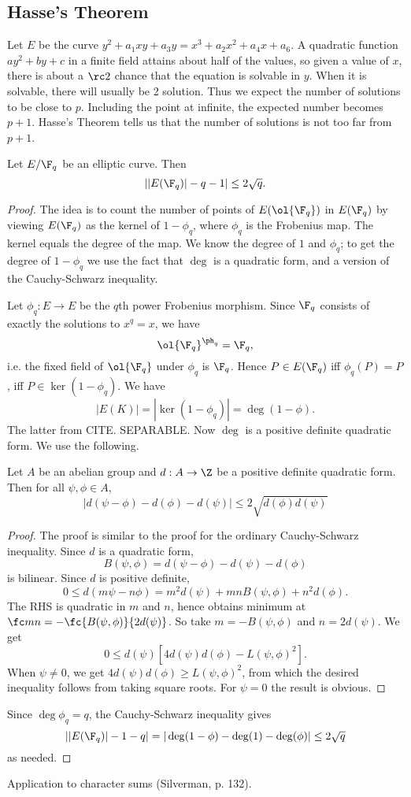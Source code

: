 \subsection{Hasse's Theorem}
Let $E$ be the curve $y^2+a_1xy+a_3y=x^3+a_2x^2+a_4x+a_6$. A quadratic function $ay^2+by+c$ in a finite field attains about half of the values, so given a value of $x$, there is about a $\rc2$ chance that the equation is solvable in $y$. When it is solvable, there will usually be 2 solution. Thus we expect the number of solutions to be close to $p$. Including the point at infinite, the expected number becomes $p+1$. Hasse's Theorem tells us that the number of solutions is not too far from $p+1$.
\begin{thm}
Let $E/\F_q$ be an elliptic curve. Then
\[
||E(\F_q)|-q-1|\le 2\sqrt q.
\]
\end{thm}
\begin{proof}
The idea is to count the number of points of $E(\ol{\F_q})$ in $E(\F_q)$ by viewing $E(\F_q)$ as the kernel of $1-\phi_q$, where $\phi_q$ is the Frobenius map. The kernel equals the degree of the map. We know the degree of $1$ and $\phi_q$; to get the degree of $1-\phi_q$ we use the fact that $\deg$ is a quadratic form, and a version of the Cauchy-Schwarz inequality.

Let $\phi_q:E\to E$ be the $q$th power Frobenius morphism. 
Since $\F_q$ consists of exactly the solutions to $x^q=x$, we have
\[
\ol{\F_q}^{\ph_q}=\F_q,
\]
i.e. the fixed field of $\ol{\F_q}$ under $\phi_q$ is $\F_q$. Hence $P\in E(\F_q)$ iff $\phi_q(P)=P$, iff $P\in \ker(1-\phi_q)$. We have
\[
|E(K)|=|\ker(1-\phi_q)|=\deg(1-\phi).
\] 
The latter from CITE. SEPARABLE. Now $\deg$ is a positive definite quadratic form. We use the following.
\begin{lem}
Let $A$ be an abelian group and $d:A\to \Z$ be a positive definite quadratic form. Then for all $\psi,\phi\in A$,
\[
|d(\psi-\phi)-d(\phi)-d(\psi)|\le 2\sqrt{d(\phi)d(\psi)}
\]
\end{lem}
\begin{proof}
The proof is similar to the proof for the ordinary Cauchy-Schwarz inequality. Since $d$ is a quadratic form,
\[
B(\psi,\phi)=d(\psi-\phi)-d(\psi)-d(\phi)
\]
is bilinear. Since $d$ is positive definite,
\[
0\le d(m\psi-n\phi)=m^2d(\psi)+mnB(\psi,\phi)+n^2d(\phi).
\]
The RHS is quadratic in $m$ and $n$, hence obtains minimum at $\fc mn=-\fc{B(\psi,\phi)}{2d(\psi)}$. So take $m=-B(\psi,\phi)$ and $n=2d(\psi)$. We get 
\[
0\le d(\psi)[4d(\psi)d(\phi)-L(\psi,\phi)^2].
\]
When $\psi\ne 0$, we get $4d(\psi)d(\phi)\ge L(\psi,\phi)^2$, from which the desired inequality follows from taking square roots.
For $\psi=0$ the result is obvious.
\end{proof}
Since $\deg \phi_q=q$, the Cauchy-Schwarz inequality gives
\[
||E(\F_q)|-1-q|=| \deg(1-\phi)-\deg(1)-\deg(\phi)|\le 2\sqrt q
\]
as needed.
\end{proof}
Application to character sums (Silverman, p. 132).
